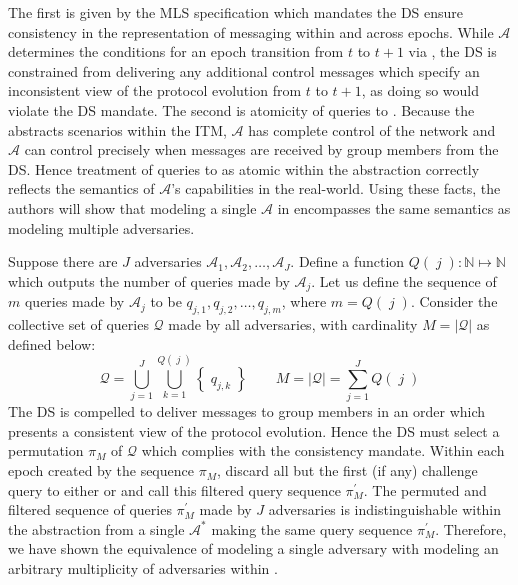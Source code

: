 \documentclass[authordraft,sigconf]{acmart}
\newcommand{\Abrev}[1]{\gls{#1}}
\newcommand{\Adversary}{\ensuremath{\mathcal{A}}\xspace}
\newcommand{\Parens}[1]{\ensuremath{\left(\;#1\;\right)}\xspace}
\newcommand{\SetNote}[1]{\ensuremath{\left\{\;#1\;\right\}}\xspace}
\begin{document}
The first is given by the \Abrev{MLS} specification which mandates the \Abrev{DS} ensure consistency in the representation of messaging within and across epochs. 
While \Adversary determines the conditions for an epoch transition from \(t\) to \(t+1\) via \CGKAsec, the \Abrev{DS} is constrained from delivering any additional control messages which specify an inconsistent view of the protocol evolution from \(t\) to \(t+1\), as doing so would violate the \Abrev{DS} mandate.
The second is atomicity of queries to .
Because the \CGKAsec abstracts scenarios within the \Abrev{ITM}, \Adversary has complete control of the network and \Adversary can control precisely when messages are received by group members from the \Abrev{DS}.
Hence treatment of queries to  as atomic within the \CGKAsec abstraction correctly reflects the semantics of \Adversary's capabilities in the real-world.
Using these facts, the authors will show that modeling a single \Adversary in \CGKAsec encompasses the same semantics as modeling multiple adversaries.

\newcommand{\Queries}[1]{\ensuremath{Q\Parens{#1}}\xspace}
\newcommand{\Nat}{\ensuremath{\mathbb{N}}\xspace}
\newcommand{\SizeOf}[1]{\ensuremath{\left|#1\right|}\xspace}

Suppose there are $J$ adversaries $\Adversary_{1}, \Adversary_{2}, \ldots, \Adversary_{J}$.
Define a function $\Queries{j}: \Nat \mapsto \Nat$ which outputs the number of queries made by $\Adversary_{j}$.
Let us define the sequence of $m$ queries made by $\Adversary_{j}$ to be $q_{j,1}, q_{j,2}, \ldots, q_{j,m}$, where $m = \Queries{j}$.
Consider the collective set of queries $\mathcal{Q}$ made by all adversaries, with cardinality $M = \SizeOf{\mathcal{Q}}$ as defined below:
\[
\mathcal{Q} = \bigcup\limits_{j=1}^{J} \bigcup\limits_{k=1}^{\Queries{j}} \SetNote{q_{j,k}}\qquad M = \SizeOf{\mathcal{Q}} = \sum_{j=1}^{J} \Queries{j}
\]
The \Abrev{DS} is compelled to deliver messages to group members in an order which presents a consistent view of the protocol evolution.
Hence the \Abrev{DS} must select a permutation $\pi_{M}$ of $\mathcal{Q}$ which complies with the consistency mandate. 
Within each epoch created by the sequence $\pi_{M}$, discard all but the first (if any) challenge query to either  or  and call this filtered query sequence $\pi_{M}^{\prime}$. 
The permuted and filtered sequence of queries $\pi_{M}^{\prime}$ made by $J$ adversaries is indistinguishable within the \CGKAsec abstraction from a single $\Adversary^{\ast}$ making the same query sequence $\pi_{M}^{\prime}$.
Therefore, we have shown the equivalence of modeling a single adversary with modeling an arbitrary multiplicity of adversaries within \CGKAsec.
\end{document}
